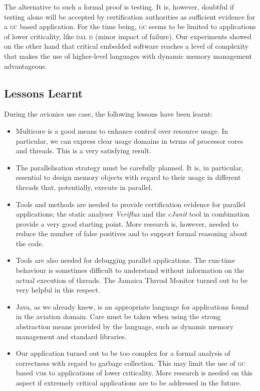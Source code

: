 \documentclass{sig-alternate}
\newcommand{\acronym}[1]{\textsc{#1}}
\begin{document}
The alternative to such a formal proof is testing.
It is, however, doubtful if testing alone will be accepted
by certification authorities 
as sufficient evidence for a \acronym{gc} based application.
For the time being, \acronym{gc} seems to be limited
to applications of lower criticality, like
\acronym{dal d} (minor impact of failure).
Our experiments showed on the other hand
that critical embedded software
reaches a level of complexity that makes 
the use of higher-level languages
with dynamic memory management advantageous.

\subsection{Lessons Learnt}\label{sub:llaoc}
During the avionics use case, the following lessons have been learnt:
\begin{itemize}
\item 
Multicore is a good means to enhance control over resource usage.
In particular, we can express clear usage domains in terms of
processor cores and threads. This is a very satisfying result.

\item
The parallelisation strategy must be carefully planned. 
It is, in particular, essential to design memory objects
with regard to their usage in different threads that,
potentially, execute in parallel.

\item
Tools and methods are needed to provide 
certification evidence for parallel applications;
the static analyser \emph{Veriflux} and the \emph{cJunit} tool
in combination provide a very good starting point.
More research is, however, needed to reduce the number
of false positives and to support formal reasoning about the code.

\item
Tools are also needed for debugging parallel applications.
The run-time behaviour is sometimes difficult to understand
without information on the actual execution of threads.
The Jamaica Thread Monitor turned out to be very helpful in this respect.

\item
Java, as we already knew, is an appropriate language 
for applications found in the aviation domain.
Care must be taken when using the strong abstraction means
provided by the language, such as dynamic memory management
and standard libraries.

\item
Our application turned out to be too complex
for a formal analysis of correctness with regard to garbage collection.
This may limit the use of \acronym{gc} based \acronym{vm}s 
to applications of lower criticality. 
More research is needed on this aspect 
if extremely critical applications
are to be addressed in the future.
\end{itemize}
\end{document}
